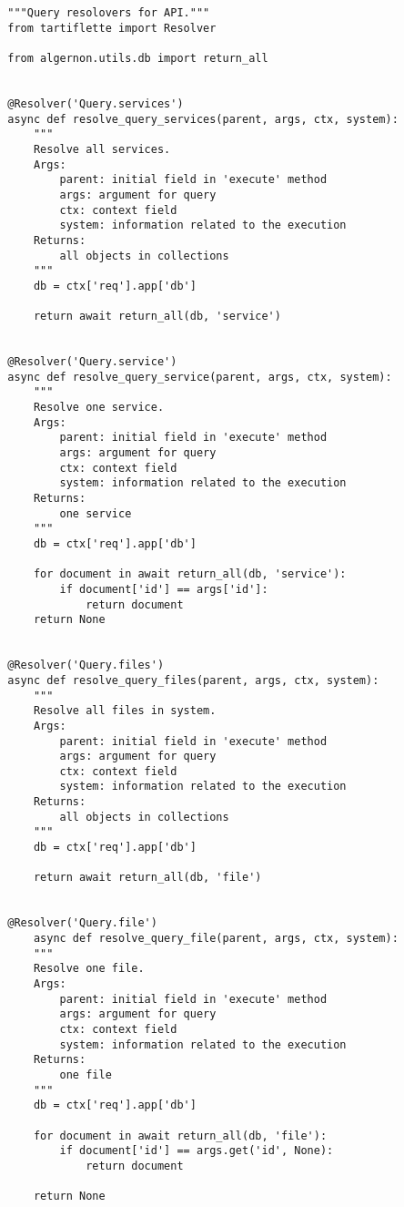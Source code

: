 \begin{Verbatim}
        """Query resolovers for API."""
        from tartiflette import Resolver

        from algernon.utils.db import return_all


        @Resolver('Query.services')
        async def resolve_query_services(parent, args, ctx, system):
            """
            Resolve all services.
            Args:
                parent: initial field in 'execute' method
                args: argument for query
                ctx: context field
                system: information related to the execution
            Returns:
                all objects in collections
            """
            db = ctx['req'].app['db']

            return await return_all(db, 'service')


        @Resolver('Query.service')
        async def resolve_query_service(parent, args, ctx, system):
            """
            Resolve one service.
            Args:
                parent: initial field in 'execute' method
                args: argument for query
                ctx: context field
                system: information related to the execution
            Returns:
                one service
            """
            db = ctx['req'].app['db']

            for document in await return_all(db, 'service'):
                if document['id'] == args['id']:
                    return document
            return None


        @Resolver('Query.files')
        async def resolve_query_files(parent, args, ctx, system):
            """
            Resolve all files in system.
            Args:
                parent: initial field in 'execute' method
                args: argument for query
                ctx: context field
                system: information related to the execution
            Returns:
                all objects in collections
            """
            db = ctx['req'].app['db']

            return await return_all(db, 'file')


        @Resolver('Query.file')
            async def resolve_query_file(parent, args, ctx, system):
            """
            Resolve one file.
            Args:
                parent: initial field in 'execute' method
                args: argument for query
                ctx: context field
                system: information related to the execution
            Returns:
                one file
            """
            db = ctx['req'].app['db']

            for document in await return_all(db, 'file'):
                if document['id'] == args.get('id', None):
                    return document

            return None
\end{Verbatim}
